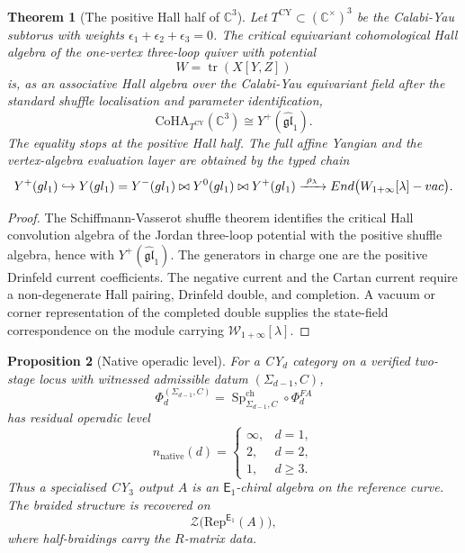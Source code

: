 \documentclass[11pt]{article}
\newtheorem{theorem}{Theorem}[section]
\newtheorem{proposition}[theorem]{Proposition}
\theoremstyle{definition}
\theoremstyle{remark}
\newcommand{\Cthree}{\mathbb{C}^{3}}
\newcommand{\CoHA}{\mathrm{CoHA}}
\newcommand{\Yp}{Y^{+}}
\newcommand{\Ym}{Y^{-}}
\newcommand{\Yz}{Y^{0}}
\newcommand{\Yfull}{Y}
\newcommand{\fglone}{\widehat{\mathfrak{gl}}_{1}}
\newcommand{\Winf}{\mathcal{W}_{1+\infty}}
\newcommand{\Eone}{\mathsf{E}_{1}}
\newcommand{\Rep}{\mathrm{Rep}}
\newcommand{\Zcen}{\mathcal{Z}}
\begin{document}
\begin{theorem}[The positive Hall half of $\Cthree$]
\label{thm:c3-positive-half}
Let $T^{\mathrm{CY}}\subset(\mathbb{C}^{\times})^3$ be the Calabi-Yau
subtorus with weights $\epsilon_1+\epsilon_2+\epsilon_3=0$. The
critical equivariant cohomological Hall algebra of the one-vertex
three-loop quiver with potential
\[
  W=\operatorname{tr}(X[Y,Z])
\]
is, as an associative Hall algebra over the Calabi-Yau equivariant
field after the standard shuffle localisation and parameter
identification,
\[
  \CoHA_{T^{\mathrm{CY}}}(\Cthree)\cong\Yp(\fglone).
\]
The equality stops at the positive Hall half. The full affine Yangian
and the vertex-algebra evaluation layer are obtained by the typed chain
\[
  \Yp(\fglone)
  \hookrightarrow
  \Yfull(\fglone)=\Ym(\fglone)\widehat{\bowtie}\Yz(\fglone)
     \widehat{\bowtie}\Yp(\fglone)
  \xrightarrow{\ \rho_\lambda\ }
  \operatorname{End}\bigl(\Winf[\lambda]\textup{-vac}\bigr).
\]
\end{theorem}

\begin{proof}
The Schiffmann-Vasserot shuffle theorem identifies the critical Hall
convolution algebra of the Jordan three-loop potential with the
positive shuffle algebra, hence with $\Yp(\fglone)$. The generators in
charge one are the positive Drinfeld current coefficients. The negative
current and the Cartan current require a non-degenerate Hall pairing,
Drinfeld double, and completion. A vacuum or corner representation of
the completed double supplies the state-field correspondence on the
module carrying $\Winf[\lambda]$.
\end{proof}

\begin{proposition}[Native operadic level]
\label{prop:native-e1}
For a CY$_d$ category on a verified two-stage locus with witnessed
admissible datum $(\Sigma_{d-1},C)$,
\[
  \Phi_d^{(\Sigma_{d-1},C)}
  =
  \operatorname{Sp}^{\mathrm{ch}}_{\Sigma_{d-1},C}\circ\Phi_d^{FA}
\]
has residual operadic level
\[
  n_{\mathrm{native}}(d)=
  \begin{cases}
  \infty,& d=1,\\
  2,& d=2,\\
  1,& d\geq 3.
  \end{cases}
\]
Thus a specialised CY$_3$ output $A$ is an $\Eone$-chiral algebra on
the reference curve. The braided structure is recovered on
\[
  \Zcen\bigl(\Rep^{\Eone}(A)\bigr),
\]
where half-braidings carry the $R$-matrix data.
\end{proposition}
\end{document}
